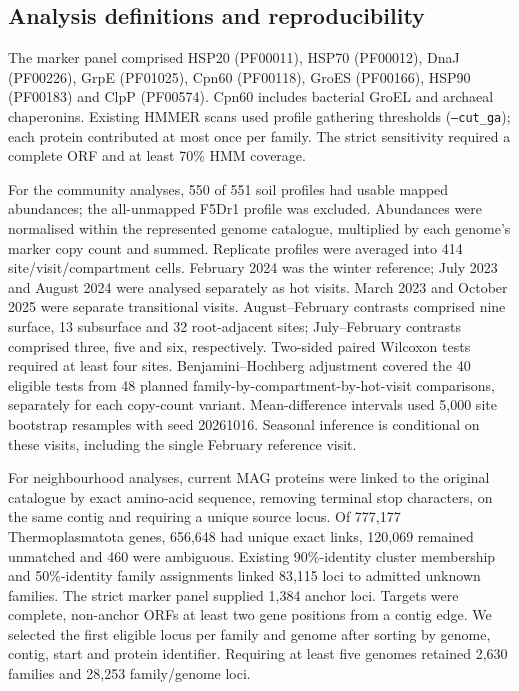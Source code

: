 \subsection*{Analysis definitions and reproducibility}

The marker panel comprised HSP20 (PF00011), HSP70 (PF00012), DnaJ (PF00226), GrpE (PF01025), Cpn60 (PF00118), GroES (PF00166), HSP90 (PF00183) and ClpP (PF00574). Cpn60 includes bacterial GroEL and archaeal chaperonins. Existing HMMER scans used profile gathering thresholds (\texttt{--cut\_ga}); each protein contributed at most once per family. The strict sensitivity required a complete ORF and at least 70\% HMM coverage.

For the community analyses, 550 of 551 soil profiles had usable mapped abundances; the all-unmapped F5Dr1 profile was excluded. Abundances were normalised within the represented genome catalogue, multiplied by each genome's marker copy count and summed. Replicate profiles were averaged into 414 site/visit/compartment cells. February 2024 was the winter reference; July 2023 and August 2024 were analysed separately as hot visits. March 2023 and October 2025 were separate transitional visits. August--February contrasts comprised nine surface, 13 subsurface and 32 root-adjacent sites; July--February contrasts comprised three, five and six, respectively. Two-sided paired Wilcoxon tests required at least four sites. Benjamini--Hochberg adjustment covered the 40 eligible tests from 48 planned family-by-compartment-by-hot-visit comparisons, separately for each copy-count variant. Mean-difference intervals used 5{,}000 site bootstrap resamples with seed 20261016. Seasonal inference is conditional on these visits, including the single February reference visit.

For neighbourhood analyses, current MAG proteins were linked to the original catalogue by exact amino-acid sequence, removing terminal stop characters, on the same contig and requiring a unique source locus. Of 777{,}177 Thermoplasmatota genes, 656{,}648 had unique exact links, 120{,}069 remained unmatched and 460 were ambiguous. Existing 90\%-identity cluster membership and 50\%-identity family assignments linked 83{,}115 loci to admitted unknown families. The strict marker panel supplied 1{,}384 anchor loci. Targets were complete, non-anchor ORFs at least two gene positions from a contig edge. We selected the first eligible locus per family and genome after sorting by genome, contig, start and protein identifier. Requiring at least five genomes retained 2{,}630 families and 28{,}253 family/genome loci.

